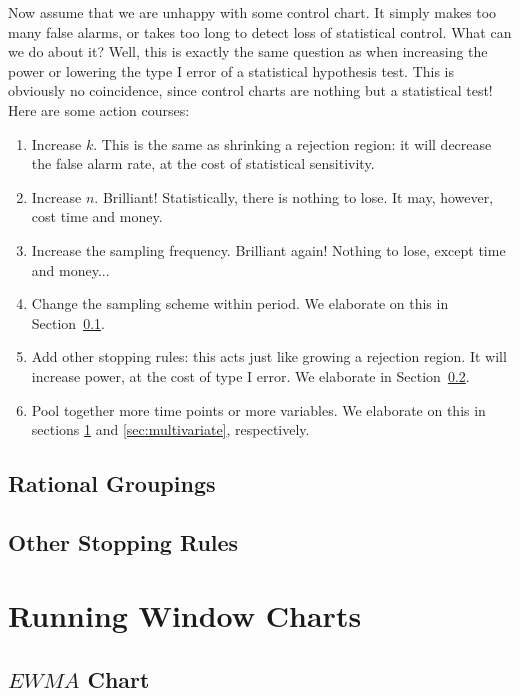 Now assume that we are unhappy with some control chart. 
It simply makes too many false alarms, or takes too long to detect loss of statistical control.
What can we do about it?
Well, this is exactly the same question as when increasing the power or lowering the type I error of a statistical hypothesis test. This is obviously no coincidence, since control charts are nothing but a statistical test!
Here are some action courses:
\begin{enumerate}
\item Increase $k$. This is the same as shrinking a rejection region: 
it will decrease the false alarm rate, at the cost of statistical sensitivity.
\item Increase $n$. Brilliant! Statistically, there is nothing to lose. It may, however, cost time and money.
\item Increase the sampling frequency. Brilliant again! Nothing to lose, except time and money...
\item Change the sampling scheme within period. We elaborate on this in Section~\ref{sec:rational_grouping}.
\item Add other stopping rules: 
this acts just like growing a rejection region. It will increase power, at the cost of type I error. We elaborate in Section~\ref{sec:stopping_rules}.
\item Pool together more time points or more variables. We elaborate on this in sections \ref{sec:running_windows} and  \ref{sec:multivariate}, respectively. 
\end{enumerate}



\subsection{Rational Groupings}
\label{sec:rational_grouping}



\subsection{Other Stopping Rules}
\label{sec:stopping_rules}






\section{Running Window Charts}
\label{sec:running_windows}
\subsection{$EWMA$ Chart}
